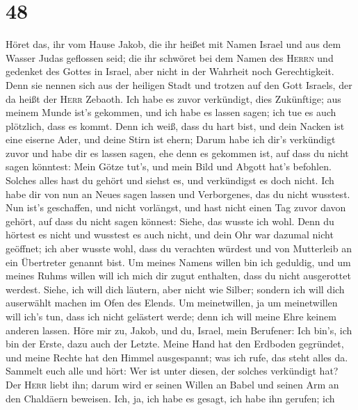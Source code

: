 \hypertarget{section-47}{%
\section{48}\label{section-47}}

 Höret das, ihr vom Hause Jakob, die ihr heißet mit Namen
Israel und aus dem Wasser Judas geflossen seid; die ihr schwöret bei dem
Namen des \textsc{Herrn} und gedenket des Gottes in Israel, aber nicht
in der Wahrheit noch Gerechtigkeit.  Denn sie nennen sich
aus der heiligen Stadt und trotzen auf den Gott Israels, der da heißt
der \textsc{Herr} Zebaoth.  Ich habe es zuvor verkündigt,
dies Zukünftige; aus meinem Munde ist's gekommen, und ich habe es lassen
sagen; ich tue es auch plötzlich, dass es kommt.  Denn ich
weiß, dass du hart bist, und dein Nacken ist eine eiserne Ader, und
deine Stirn ist ehern;  Darum habe ich dir's verkündigt
zuvor und habe dir es lassen sagen, ehe denn es gekommen ist, auf dass
du nicht sagen könntest: Mein Götze tut's, und mein Bild und Abgott
hat's befohlen.  Solches alles hast du gehört und siehst
es, und verkündigst es doch nicht. Ich habe dir von nun an Neues sagen
lassen und Verborgenes, das du nicht wusstest.  Nun ist's
geschaffen, und nicht vorlängst, und hast nicht einen Tag zuvor davon
gehört, auf dass du nicht sagen könnest: Siehe, das wusste ich wohl.
 Denn du hörtest es nicht und wusstest es auch nicht, und
dein Ohr war dazumal nicht geöffnet; ich aber wusste wohl, dass du
verachten würdest und von Mutterleib an ein Übertreter genannt bist.
 Um meines Namens willen bin ich geduldig, und um meines
Ruhms willen will ich mich dir zugut enthalten, dass du nicht
ausgerottet werdest.  Siehe, ich will dich läutern, aber
nicht wie Silber; sondern ich will dich auserwählt machen im Ofen des
Elends.  Um meinetwillen, ja um meinetwillen will ich's
tun, dass ich nicht gelästert werde; denn ich will meine Ehre keinem
anderen lassen.  Höre mir zu, Jakob, und du, Israel, mein
Berufener: Ich bin's, ich bin der Erste, dazu auch der Letzte.
 Meine Hand hat den Erdboden gegründet, und meine Rechte
hat den Himmel ausgespannt; was ich rufe, das steht alles da.
 Sammelt euch alle und hört: Wer ist unter diesen, der
solches verkündigt hat? Der \textsc{Herr} liebt ihn; darum wird er
seinen Willen an Babel und seinen Arm an den Chaldäern beweisen.
 Ich, ja, ich habe es gesagt, ich habe ihn gerufen; ich
